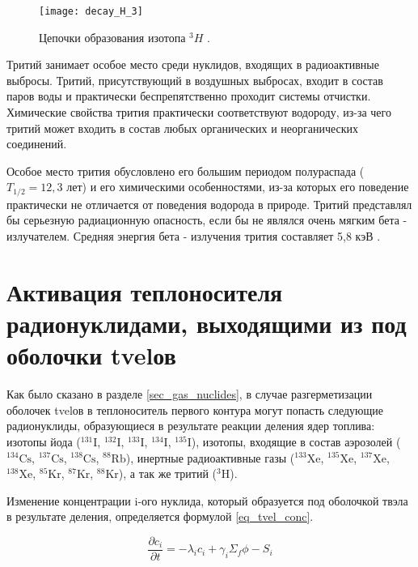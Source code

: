 \begin{figure}[ht!]
    \centering
    \texttt{[image: decay\_H\_3]}
    \captionsetup{justification=centering}
    \caption{Цепочки образования изотопа $^{3}H$ \cite{periodic_table}.}
    \label{fig_H_3_decay}
\end{figure}

Тритий занимает особое место среди нуклидов, входящих в радиоактивные выбросы. Тритий, присутствующий в воздушных 
выбросах, входит в состав паров воды и практически беспрепятственно проходит системы отчистки. Химические свойства 
трития практически соответствуют водороду, из-за чего тритий может входить в состав любых органических и неорганических 
соединений.

Особое место трития обусловлено его большим периодом полураспада ($T_{1/2}=12,3$ лет) и его химическими особенностями, 
из-за которых его поведение практически не отличается от поведения водорода в природе. Тритий представлял бы серьезную 
радиационную опасность, если бы не являлся очень мягким бета - излучателем. Средняя энергия бета - излучения трития 
составляет 5,8 кэВ \cite{nuc_waste}.

\section{Активация теплоносителя радионуклидами, выходящими из под оболочки \ac{tvel}ов}
\label{sec_tvel_nuclides}

Как было сказано в разделе \ref{sec_gas_nuclides}, в случае разгерметизации оболочек \ac{tvel}ов в теплоноситель 
первого контура могут попасть следующие радионуклиды, образующиеся в результате реакции деления ядер топлива: изотопы 
йода ($^{131}\text{I}$, $^{132}\text{I}$, $^{133}\text{I}$, $^{134}\text{I}$, $^{135}\text{I}$), изотопы, входящие в 
состав аэрозолей ($^{134}\text{Cs}$, $^{137}\text{Cs}$, $^{138}\text{Cs}$, $^{88}\text{Rb}$), инертные радиоактивные 
газы ($^{133}\text{Xe}$, $^{135}\text{Xe}$, $^{137}\text{Xe}$, $^{138}\text{Xe}$, $^{85}\text{Kr}$, $^{87}\text{Kr}$, 
$^{88}\text{Kr}$), а так же тритий ($^{3}\text{H}$).

Изменение концентрации i-ого нуклида, который образуется под оболочкой твэла в результате деления, определяется формулой 
\ref{eq_tvel_conc}.

\begin{equation}
    \label{eq_tvel_conc}
    \frac{\partial c_{i}}{\partial t} = -\lambda_{i}c_{i} + \gamma_{i}\Sigma_{f}\phi - S_{i}
\end{equation}


